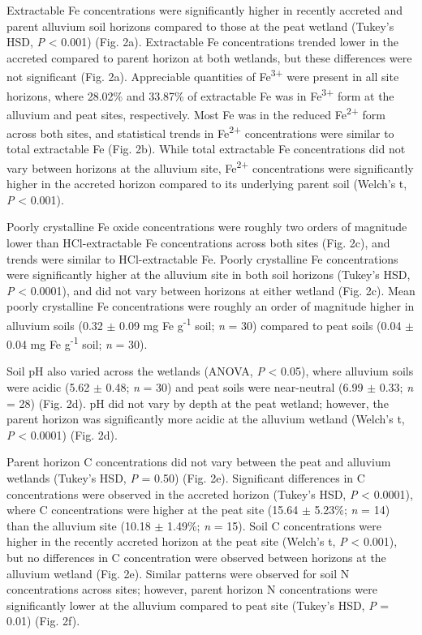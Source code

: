 \documentclass[
  12pt,
]{article}
\begin{document}
Extractable Fe concentrations were significantly higher in recently
accreted and parent alluvium soil horizons compared to those at the peat
wetland (Tukey's HSD, \emph{P} \textless{} 0.001) (Fig. 2a). Extractable
Fe concentrations trended lower in the accreted compared to parent
horizon at both wetlands, but these differences were not significant
(Fig. 2a). Appreciable quantities of Fe\textsuperscript{3+} were present
in all site horizons, where 28.02\% and 33.87\% of extractable Fe was in
Fe\textsuperscript{3+} form at the alluvium and peat sites,
respectively. Most Fe was in the reduced Fe\textsuperscript{2+} form
across both sites, and statistical trends in Fe\textsuperscript{2+}
concentrations were similar to total extractable Fe (Fig. 2b). While
total extractable Fe concentrations did not vary between horizons at the
alluvium site, Fe\textsuperscript{2+} concentrations were significantly
higher in the accreted horizon compared to its underlying parent soil
(Welch's t, \emph{P} \textless{} 0.001).

Poorly crystalline Fe oxide concentrations were roughly two orders of
magnitude lower than HCl-extractable Fe concentrations across both sites
(Fig. 2c), and trends were similar to HCl-extractable Fe. Poorly
crystalline Fe concentrations were significantly higher at the alluvium
site in both soil horizons (Tukey's HSD, \emph{P} \textless{} 0.0001),
and did not vary between horizons at either wetland (Fig. 2c). Mean
poorly crystalline Fe concentrations were roughly an order of magnitude
higher in alluvium soils (0.32 \(\pm\) 0.09 mg Fe g\textsuperscript{-1}
soil; \emph{n} = 30) compared to peat soils (0.04 \(\pm\) 0.04 mg Fe
g\textsuperscript{-1} soil; \emph{n} = 30).

Soil pH also varied across the wetlands (ANOVA, \emph{P} \textless{}
0.05), where alluvium soils were acidic (5.62 \(\pm\) 0.48; \emph{n} =
30) and peat soils were near-neutral (6.99 \(\pm\) 0.33; \emph{n} = 28)
(Fig. 2d). pH did not vary by depth at the peat wetland; however, the
parent horizon was significantly more acidic at the alluvium wetland
(Welch's t, \emph{P} \textless{} 0.0001) (Fig. 2d).

Parent horizon C concentrations did not vary between the peat and
alluvium wetlands (Tukey's HSD, \emph{P} = 0.50) (Fig. 2e). Significant
differences in C concentrations were observed in the accreted horizon
(Tukey's HSD, \emph{P} \textless{} 0.0001), where C concentrations were
higher at the peat site (15.64 \(\pm\) 5.23\%; \emph{n} = 14) than the
alluvium site (10.18 \(\pm\) 1.49\%; \emph{n} = 15). Soil C
concentrations were higher in the recently accreted horizon at the peat
site (Welch's t, \emph{P} \textless{} 0.001), but no differences in C
concentration were observed between horizons at the alluvium wetland
(Fig. 2e). Similar patterns were observed for soil N concentrations
across sites; however, parent horizon N concentrations were
significantly lower at the alluvium compared to peat site (Tukey's HSD,
\emph{P} = 0.01) (Fig. 2f).
\end{document}
